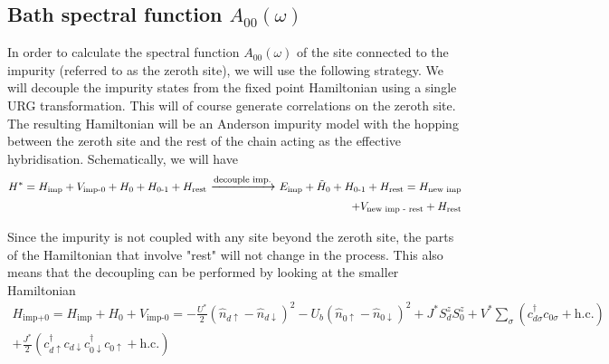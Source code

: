 \documentclass{report}
\numberwithin{equation}{section}
\begin{document}
\subsection{Bath spectral function \(A_{00}(\omega)\)}
In order to calculate the spectral function \(A_{00}(\omega)\) of the site connected to the impurity (referred to as the zeroth site), we will use the following strategy. We will decouple the impurity states from the fixed point Hamiltonian using a single URG transformation. This will of course generate correlations on the zeroth site. The resulting Hamiltonian will be an Anderson impurity model with the hopping between the zeroth site and the rest of the chain acting as the effective hybridisation. Schematically, we will have
\begin{equation}\begin{aligned}
	H^* = H_\text{imp} + V_\text{imp-0} + H_\text{0} + H_\text{0-1} + H_\text{rest} ~ \mathlarger{\xrightarrow{\text{decouple imp.}}} ~ E_\text{imp} + \tilde H_\text{0} + H_\text{0-1} + H_\text{rest} = H_\text{new imp} \\
	+ V_\text{new imp - rest} + H_\text{rest}
\end{aligned}\end{equation}

Since the impurity is not coupled with any site beyond the zeroth site, the parts of the Hamiltonian that involve "rest" will not change in the process. This also means that the decoupling can be performed by looking at the smaller Hamiltonian
\begin{equation}\begin{aligned}
	H_\text{imp+0} = H_\text{imp} + H_\text{0} + V_\text{imp-0} = -\frac{U^*}{2}\left( \hat n_{d \uparrow} - \hat n_{d \downarrow} \right)^2 - U_b \left( \hat n_{0 \uparrow} - \hat n_{0 \downarrow} \right)^2 + J^*S_d^z S_0^z + {V^*}\sum_\sigma \left(c^\dagger_{d\sigma}c_{0\sigma} + \text{h.c.}\right) \\
	+ \frac{J^*}{2}\left( c^\dagger_{d \uparrow}c_{d \downarrow} c^\dagger_{0 \downarrow} c_{0 \uparrow} + \text{h.c.} \right) 
\end{aligned}\end{equation}
\end{document}
